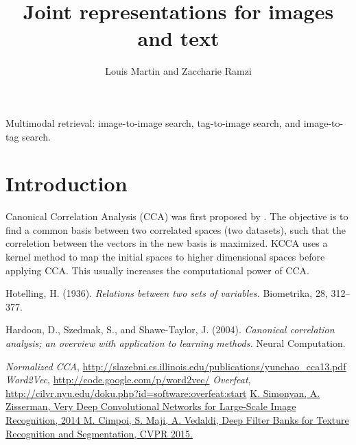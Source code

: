 \documentclass[a4paper,12pt]{article}
\title{Joint representations for images and text}
\author{Louis Martin and Zaccharie Ramzi}
\begin{document}
\maketitle

Multimodal retrieval: image-to-image search, tag-to-image search,
and image-to-tag search.

\begin{abstract}
\end{abstract}

\section{Introduction}

Canonical Correlation Analysis (CCA) was first proposed by \cite{originalcca}.
The objective is to find a common basis between two correlated spaces (two datasets), such that the correletion between the vectors in the new basis is maximized.
KCCA uses a kernel method to map the initial spaces to higher dimensional spaces before applying CCA. This usually increases the computational power of CCA.

\cite{hardooncca}


\begin{thebibliography}{7}

  Hotelling, H.
  (1936). 
  \emph{Relations between two sets of variables.}
  Biometrika, 28, 312–377.

  Hardoon, D., Szedmak, S., and Shawe-Taylor, J.
  (2004).
  \emph{Canonical correlation analysis; an overview with application to learning methods.}
  Neural Computation.

  \emph{Normalized CCA},
  \url{http://slazebni.cs.illinois.edu/publications/yunchao\_cca13.pdf}
  \emph{Word2Vec},
  \url{http://code.google.com/p/word2vec/}
  \emph{Overfeat},
  \url{http://cilvr.nyu.edu/doku.php?id=software:overfeat:start}
  \href{http://arxiv.org/pdf/1409.1556.pdf}{
  K. Simonyan, A. Zisserman, Very Deep Convolutional Networks for Large-Scale Image Recognition, 2014
  }
  \href{http://www.robots.ox.ac.uk/~vgg/publications/2015/Cimpoi15/cimpoi15.pdf}{
  M. Cimpoi, S. Maji, A. Vedaldi, Deep Filter Banks for Texture Recognition and Segmentation, CVPR 2015.
  }
\end{thebibliography}
\end{document}
